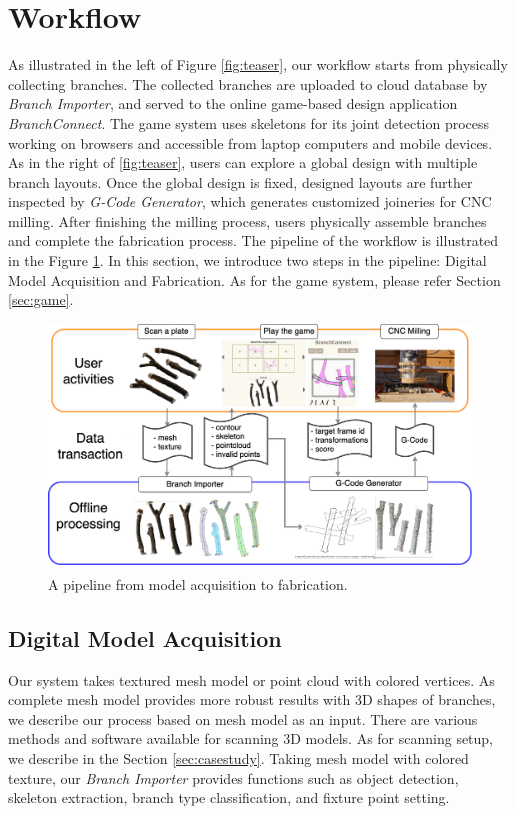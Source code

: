 \section{Workflow}
As illustrated in the left of Figure \ref{fig:teaser}, our workflow starts from physically collecting branches.
The collected branches are uploaded to cloud database by \textit{Branch Importer}, and served to the online game-based design application \textit{BranchConnect}.
The game system uses skeletons for its joint detection process working on browsers and accessible from laptop computers and mobile devices.
As in the right of \ref{fig:teaser}, users can explore a global design with multiple branch layouts.
Once the global design is fixed, designed layouts are further inspected by \textit{G-Code Generator}, which generates customized joineries for CNC milling.
After finishing the milling process, users physically assemble branches and complete the fabrication process.
The pipeline of the workflow is illustrated in the Figure \ref{fig:pipeline}.
In this section, we introduce two steps in the pipeline: Digital Model Acquisition and Fabrication.
As for the game system, please refer Section \ref{sec:game}.

\begin{figure}[ht]
  \begin{center}
    \includegraphics[width = 0.4\paperwidth]{images/workflow/pipeline.png}
    \caption{A pipeline from model acquisition to fabrication.}
    \label{fig:pipeline}
  \end{center}
\end{figure}

\subsection{Digital Model Acquisition}
Our system takes textured mesh model or point cloud with colored vertices.
As complete mesh model provides more robust results with 3D shapes of branches, we describe our process based on mesh model as an input.
There are various methods and software available for scanning 3D models.
As for scanning setup, we describe in the Section \ref{sec:casestudy}.
Taking mesh model with colored texture, our \textit{Branch Importer} provides functions such as object detection, skeleton extraction, branch type classification, and fixture point setting.

